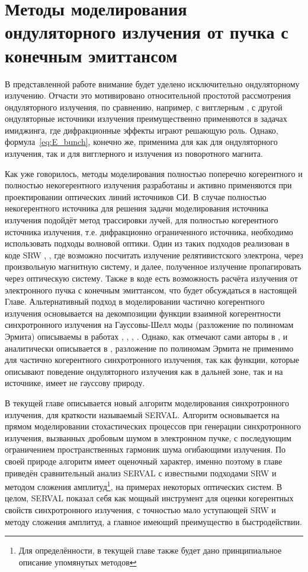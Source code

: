 
\chapter{Методы моделирования ондуляторного излучения от пучка с конечным эмиттансом} \label{chapt2}
В представленной работе внимание будет уделено исключительно ондуляторному излучению. Отчасти это мотивировано относительной простотой рассмотрения ондуляторного излучения, по сравнению, например, с вигглерным \cite{geloni_brightness_2014}, с другой ондуляторные источники излучения преимущественно применяются в задачах имиджинга, где дифракционные эффекты играют решающую роль. Однако, формула~\ref{eq:E_bunch}, конечно же, применима для как для ондуляторного излучения, так и для вигглерного и излучения из поворотного магнита. 

Как уже говорилось, методы моделирования полностью поперечно когерентного и полностью некогерентного излучения разработаны и активно применяются при проектировании оптических линий источников СИ. В случае полностью некогерентного источника для решения задачи моделирования источника излучения подойдёт метод трассировки лучей, для полностью когерентного источника излучения, т.е. дифракционно ограниченного источника, необходимо использовать подходы волновой оптики. Один из таких подходов реализован в коде SRW  \cite{chubar_accurate_1998}, \cite{chubar_simulation_2006}, где возможно посчитать излучение релятивистского электрона, через произвольную магнитную систему, и далее, полученное излучение пропагировать через оптическую систему. Также в коде есть возможность расчёта излучения от электронного пучка с конечным эмиттансом, что будет обсуждаться в настоящей Главе. Альтернативный подход в моделировании частично когерентного излучения основывается на декомпозиции функции взаимной когерентности синхротронного излучения на Гауссовы-Шелл моды (разложение по полиномам Эрмита) описываемы в работах \cite{singer_modelling_2011}, \cite{hua_application_2012}, \cite{khubbutdinov_coherence_2019}, \cite{noauthor_iucr_nodate}. Однако, как отмечают сами авторы в \cite{khubbutdinov_coherence_2019}, \cite{noauthor_iucr_nodate} и аналитически описывается в \cite{geloni_transverse_2008}, разложение по полиномам Эрмита не применимо для частично когерентного синхротронного излучения, так как функции, которые описывают поведение ондуляторного излучения как в дальней зоне, так и на источнике, имеет не гауссову природу.

В текущей главе описывается новый алгоритм моделирования синхротронного излучения, для краткости называемый SERVAL. Алгоритм основывается на прямом моделировании стохастических процессов при генерации синхротронного излучения, вызванных дробовым шумом в электронном пучке, с последующим ограничением пространственных гармоник шума огибающими излучения. По своей природе алгоритм имеет оценочный характер, именно поэтому в главе приведён сравнительный анализ SERVAL с известными подходами SRW и методом сложения амплитуд\footnote{Для определённости, в текущей главе также будет дано принципиальное описание упомянутых методов}, на примерах некоторых оптических систем. В целом, SERVAL показал себя как мощный инструмент для оценки когерентных свойств синхротронного излучения, с точностью мало уступающей SRW и методу сложения амплитуд, а главное имеющий преимущество в быстродействии. 
